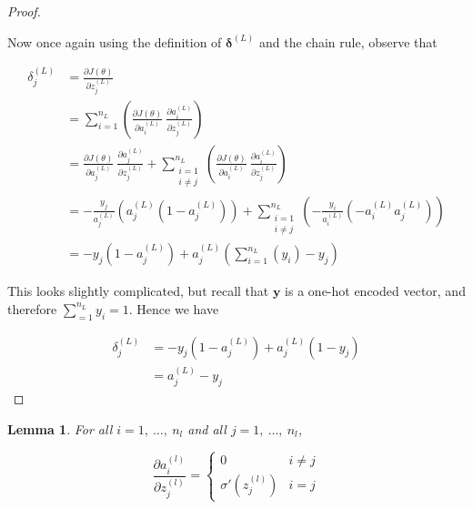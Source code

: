 \documentclass{article}[11pt]
\newtheorem{lemma}{Lemma}
\begin{document}
\begin{proof}
\begin{itemize}
            \end{itemize}
            
            Now once again using the definition of $\boldsymbol{\delta}^{(L)}$ and the chain rule, observe that
            
            $$ \begin{aligned}
            \delta^{(L)}_j &= \frac{\partial J(\theta)}{\partial z^{(L)}_j} \\
            &= \sum_{i=1}^{n_L} \left( \frac{\partial J(\theta)}{\partial a^{(L)}_i} \ \frac{\partial a^{(L)}_i}{\partial z^{(L)}_j} \right) \\
            &= \frac{\partial J(\theta)}{\partial a^{(L)}_j} \ \frac{\partial a^{(L)}_j}{\partial z^{(L)}_j} + \sum_{\substack{i=1 \\ i \neq j}}^{n_L} \left( \frac{\partial J(\theta)}{\partial a^{(L)}_i} \ \frac{\partial a^{(L)}_i}{\partial z^{(L)}_j} \right) \\
            &= - \frac{y_j}{a^{(L)}_j} \left( a^{(L)}_j (1 - a^{(L)}_j) \right) + \sum_{\substack{i=1 \\ i \neq j}}^{n_L} \left( - \frac{y_i}{a^{(L)}_i} \left(- a^{(L)}_i a^{(L)}_j \right) \right) \\
            &= - y_j (1 - a^{(L)}_j) + a^{(L)}_j \left( \sum_{i=1}^{n_L} \left( y_i \right) - y_j \right)
            \end{aligned} $$
            
            This looks slightly complicated, but recall that $\mathbf{y}$ is a one-hot encoded vector, and therefore $\sum_{=1}^{n_L} y_i = 1$. Hence we have
            
            $$ \begin{aligned}
            \delta^{(L)}_j &= - y_j (1 - a^{(L)}_j) + a^{(L)}_j (1 - y_j) \\
            &= a^{(L)}_j - y_j
            \end{aligned} $$
            
        \end{proof}
        
        
        \begin{lemma} For all $i = 1, \ \ldots, \ n_l$ and all $j = 1, \ \ldots, \ n_l$,
            
            $$
            \frac{\partial a^{(l)}_i}{\partial z^{(l)}_j} = \begin{cases}
                0 & i \neq j \\
                \sigma'(z^{(l)}_j) & i = j
            \end{cases}
            $$
            
        \end{lemma}
    
\end{document}
